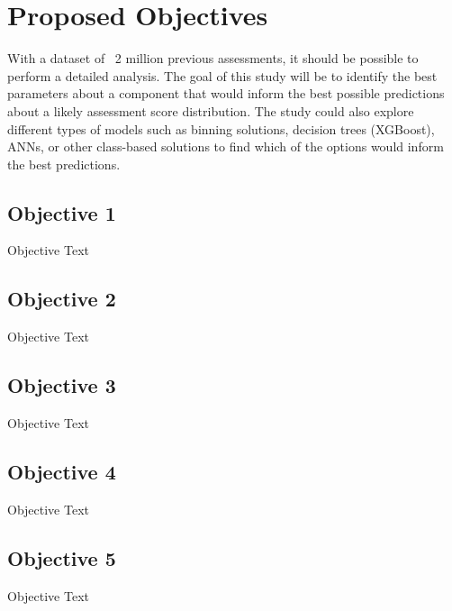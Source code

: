 \documentclass[NewProceedings,letterpaper,NoPageNumbers]{ascelike-new}
\begin{document}
\section{Proposed Objectives}

With a dataset of ~2 million previous assessments, it should be possible to perform a detailed analysis.  The goal of this study will be to identify the best parameters about a component that would inform the best possible predictions about a likely assessment score distribution.  The study could also explore different types of models such as binning solutions, decision trees (XGBoost), ANNs, or other class-based solutions to find which of the options would inform the best predictions.

\subsection{Objective 1}

Objective Text

\subsection{Objective 2}

Objective Text

\subsection{Objective 3}

Objective Text

\subsection{Objective 4}

Objective Text

\subsection{Objective 5}

Objective Text
\end{document}
